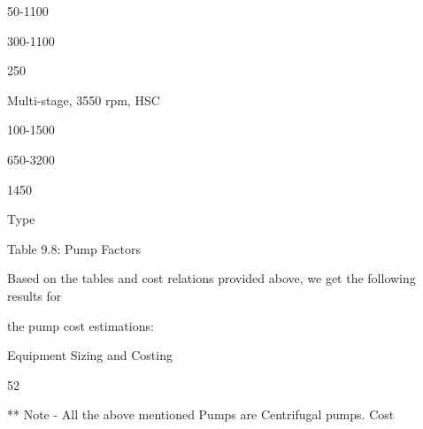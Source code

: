 \documentclass[a4paper,portrait,12pt]{article}
\begin{document}
50-1100





300-1100





250





\begin{flushleft}
Multi-stage, 3550 rpm, HSC
\end{flushleft}





100-1500





650-3200





1450





\begin{flushleft}
Type
\end{flushleft}





\begin{flushleft}
Table 9.8: Pump Factors
\end{flushleft}





\begin{flushleft}
Based on the tables and cost relations provided above, we get the following results for
\end{flushleft}


\begin{flushleft}
the pump cost estimations:
\end{flushleft}





\begin{flushleft}
\newpage
Equipment Sizing and Costing
\end{flushleft}





52





\begin{flushleft}
** Note - All the above mentioned Pumps are Centrifugal pumps. Cost
\end{flushleft}
\end{document}
